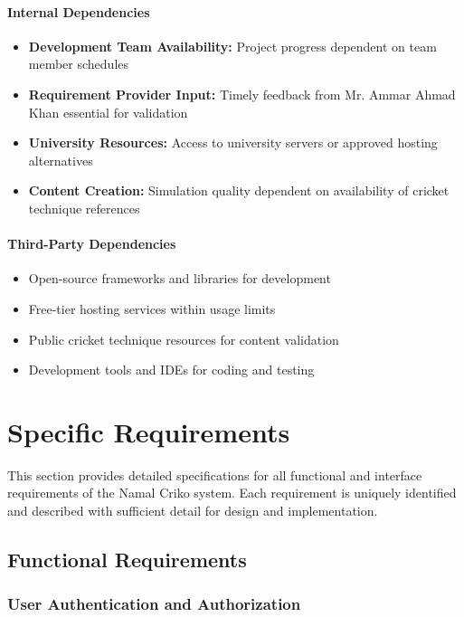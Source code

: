 \documentclass[12pt,a4paper]{article}
\begin{document}
\begin{enumerate}
\paragraph{Internal Dependencies}
\begin{itemize}
    \item \textbf{Development Team Availability:} Project progress dependent on team member schedules
    \item \textbf{Requirement Provider Input:} Timely feedback from Mr. Ammar Ahmad Khan essential for validation
    \item \textbf{University Resources:} Access to university servers or approved hosting alternatives
    \item \textbf{Content Creation:} Simulation quality dependent on availability of cricket technique references
\end{itemize}

\paragraph{Third-Party Dependencies}
\begin{itemize}
    \item Open-source frameworks and libraries for development
    \item Free-tier hosting services within usage limits
    \item Public cricket technique resources for content validation
    \item Development tools and IDEs for coding and testing
\end{itemize}

\newpage

\section{Specific Requirements}

This section provides detailed specifications for all functional and interface requirements of the Namal Criko system. Each requirement is uniquely identified and described with sufficient detail for design and implementation.

\subsection{Functional Requirements}

\subsubsection{User Authentication and Authorization}


\end{enumerate}
\end{document}
